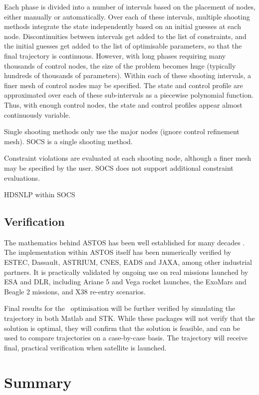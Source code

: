 Each phase is divided into a number of intervals based on the placement of nodes, either manually or automatically.
Over each of these intervals, multiple shooting methods integrate the state independently based on an initial guesses at each node. Discontinuities between intervals get added to the list of constraints, and the initial guesses get added to the list of optimisable parameters, so that the final trajectory is continuous. However, with long phases requiring many thousands of control nodes, the size of the problem becomes huge (typically hundreds of thousands of parameters). Within each of these shooting intervals, a finer mesh of control nodes may be specified. The state and control profile are approximated over each of these sub-intervals as a piecewise polynomial function. Thus, with enough control nodes, the state and control profiles appear almost continuously variable.

Single shooting methods only use the major nodes (ignore control refinement mesh). SOCS is a single shooting method.

Constraint violations are evaluated at each shooting node, although a finer mesh may be specified by the user. SOCS does not support additional constraint evaluations.

HDSNLP within SOCS

\subsection{Verification} \label{sub:ASTOS-Verification}

The mathematics behind ASTOS has been well established for many decades \parencite{Kaplan1976}. The implementation within ASTOS itself has been numerically verified by ESTEC, Dassault, ASTRIUM, CNES, EADS and JAXA, among other industrial partners. It is practically validated by ongoing use on real missions launched by ESA and DLR, including Ariane 5 and Vega rocket launches, the ExoMars and Beagle 2 missions, and X38 re-entry scenarios.
 
Final results for the \BW\ optimisation will be further verified by simulating the trajectory in both Matlab and STK. While these packages will not verify that the solution is optimal, they will confirm that the solution is feasible, and can be used to compare trajectories on a case-by-case basis. The trajectory will receive final, practical verification when satellite is launched.

\section{Summary} \label{sec:Optimisation-Summary}

